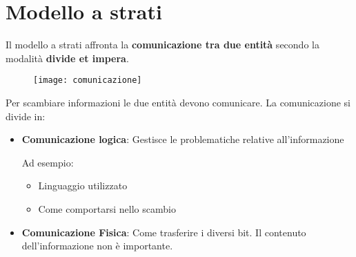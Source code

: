 \documentclass[a4paper]{article}
\begin{document}
\section{Modello a strati}
Il modello a strati affronta la \textbf{comunicazione tra due entità} secondo la modalità
\textbf{divide et impera}.
\begin{figure}[H]
  \centering
  \texttt{[image: comunicazione]}
\end{figure}
\noindent
Per scambiare informazioni le due entità devono comunicare. La comunicazione si divide in:
\begin{itemize}
  \item \textbf{Comunicazione logica}: Gestisce le problematiche relative all'informazione

    \noindent Ad esempio:
    \begin{itemize}
      \item Linguaggio utilizzato
      \item Come comportarsi nello scambio
    \end{itemize}

  \item \textbf{Comunicazione Fisica}: Come trasferire i diversi bit. Il contenuto
    dell'informazione non è importante.
\end{itemize}
\end{document}
